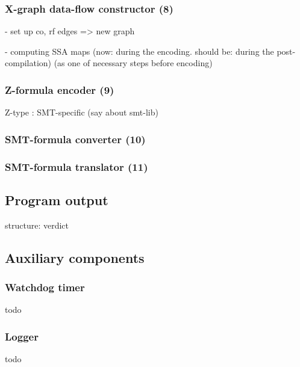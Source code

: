 \subsubsection{X-graph data-flow constructor (8)}
\label{ch:impl:proc:x-df}%

- set up co, rf edges => new graph

- computing SSA maps (now: during the encoding. should be: during the post-compilation) (as one of necessary steps before encoding)


\subsubsection{Z-formula encoder (9)}
\label{ch:impl:proc:z-encoder}

Z-type : SMT-specific (say about smt-lib)


\subsubsection{SMT-formula converter (10)}
\label{ch:impl:proc:smt-converter}%


\subsubsection{SMT-formula translator (11)}
\label{ch:impl:proc:smt-solver}%



\subsection{Program output}
\label{ch:impl:out}

structure: verdict




\subsection{Auxiliary components}
\label{ch:impl:aux}

\subsubsection{Watchdog timer}
\label{ch:impl:aux:watchdog}


todo

\subsubsection{Logger}
\label{ch:impl:aux:logger}


todo




